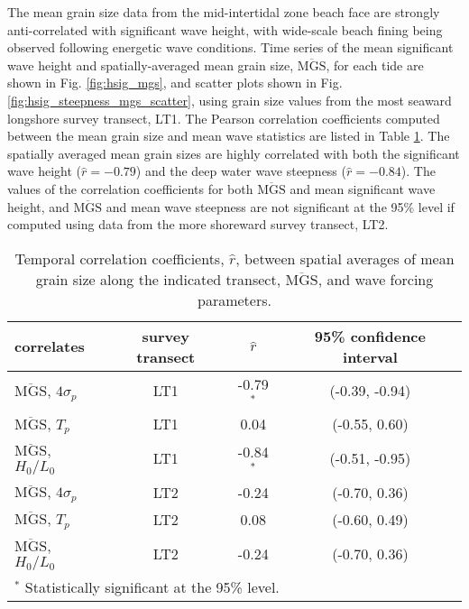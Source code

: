 \documentclass[preprint,12pt,authoryear]{elsarticle}
\begin{document}
The mean grain size data from the mid-intertidal zone beach face are strongly anti-correlated with significant wave height, with wide-scale beach fining being observed following energetic wave conditions. Time series of the mean significant wave height and spatially-averaged mean grain size, $\overline{\mathrm{MGS}}$, for each tide are shown in Fig. \ref{fig:hsig_mgs}, and scatter plots shown in Fig. \ref{fig:hsig_steepness_mgs_scatter}, using grain size values from the most seaward longshore survey transect, LT1. The Pearson correlation coefficients computed between the mean grain size and mean wave statistics are listed in Table \ref{table:temporal_correlations}. The spatially averaged mean grain sizes are highly correlated with both the significant wave height ($\hat{r}=-0.79$) and the deep water wave steepness ($\hat{r}=-0.84$). The values of the correlation coefficients for both $\overline{\mathrm{MGS}}$ and mean significant wave height, and $\overline{\mathrm{MGS}}$ and mean wave steepness are not significant at the 95\% level if computed using data from the more shoreward survey transect, LT2.

\begin{table}[tbp!]
	\caption[Temporal correlation coefficients: mean grain size and wave parameters]{Temporal correlation coefficients, $\hat{r}$, between spatial averages of mean grain size along the indicated transect, $\overline{\mathrm{MGS}}$, and wave forcing parameters.\label{table:temporal_correlations}} 
	\centering
	\begin{tabular}{lccc}
		\hline
		correlates & survey transect & $\hat{r}$ & 95\% confidence interval\\
		\hline
		$\overline{\mathrm{MGS}}$, $4\sigma_p$ & LT1 & -0.79$^{*}$ & (-0.39, -0.94)\\
		$\overline{\mathrm{MGS}}$, $T_p$ & LT1 & 0.04 & (-0.55, 0.60)\\
		$\overline{\mathrm{MGS}}$, $H_0/L_0$ & LT1 & -0.84$^{*}$ & (-0.51, -0.95)\\
		$\overline{\mathrm{MGS}}$, $4\sigma_p$ & LT2 & -0.24 & (-0.70, 0.36)\\
		$\overline{\mathrm{MGS}}$, $T_p$ & LT2 & 0.08 & (-0.60, 0.49)\\
		$\overline{\mathrm{MGS}}$, $H_0/L_0$ & LT2 & -0.24 & (-0.70, 0.36)\\
		\hline
		\multicolumn{4}{l}{$^{*}$ Statistically significant at the 95\% level.}
	\end{tabular}
\end{table}
\end{document}

